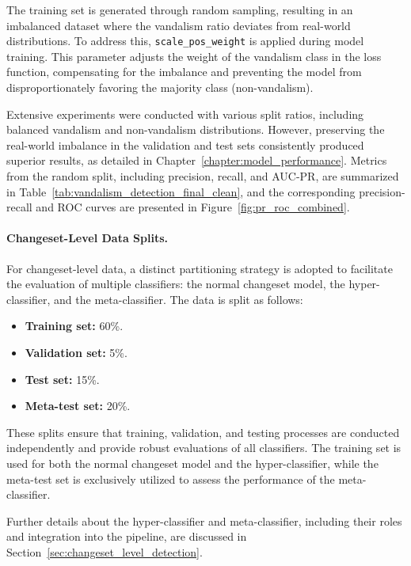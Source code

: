 \documentclass[
    13pt, %
    a4paper, %
    listof=totoc, %
    bibliography=totoc, %
    index=totoc, %
    headsepline
]{scrreprt}
\begin{document}
The training set is generated through random sampling, resulting in an imbalanced dataset where the vandalism ratio deviates from real-world distributions. To address this, \texttt{scale\_pos\_weight} is applied during model training. This parameter adjusts the weight of the vandalism class in the loss function, compensating for the imbalance and preventing the model from disproportionately favoring the majority class (non-vandalism). 

Extensive experiments were conducted with various split ratios, including balanced vandalism and non-vandalism distributions. However, preserving the real-world imbalance in the validation and test sets consistently produced superior results, as detailed in Chapter~\ref{chapter:model_performance}. Metrics from the random split, including precision, recall, and AUC-PR, are summarized in Table~\ref{tab:vandalism_detection_final_clean}, and the corresponding precision-recall and ROC curves are presented in Figure~\ref{fig:pr_roc_combined}.

\paragraph{Changeset-Level Data Splits.}
For changeset-level data, a distinct partitioning strategy is adopted to facilitate the evaluation of multiple classifiers: the normal changeset model, the hyper-classifier, and the meta-classifier. The data is split as follows:

\begin{itemize}
    \item \textbf{Training set:} 60\%.
    \item \textbf{Validation set:} 5\%.
    \item \textbf{Test set:} 15\%.
    \item \textbf{Meta-test set:} 20\%.
\end{itemize}

These splits ensure that training, validation, and testing processes are conducted independently and provide robust evaluations of all classifiers. The training set is used for both the normal changeset model and the hyper-classifier, while the meta-test set is exclusively utilized to assess the performance of the meta-classifier.

Further details about the hyper-classifier and meta-classifier, including their roles and integration into the pipeline, are discussed in Section~\ref{sec:changeset_level_detection}.
\end{document}
